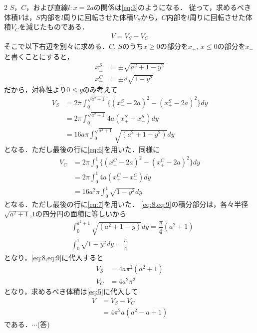 \documentclass[../../main.tex]{subfiles}
\begin{document}
\begin{multicols}{2}
  $S$，$C$，および直線$l:x=2a$の関係は\cref{eq:3}のようになる．
  従って，求めるべき体積$V$は，$S$内部を$l$周りに回転させた体積$V_S$から，$C$内部を$l$周りに回転させた体積$V_C$を減じたものである．
  \begin{align}
    V = V_S - V_C\label{eq:5}
  \end{align}
  そこで以下右辺を別々に求める．$C$, $S$のうち$x\ge 0$の部分を$x_{+}$, $x\le 0$の部分を$x_{-}$と書くことにすると，
  \begin{align}
    x^{S}_{\pm} & = \pm \sqrt{a^2+1-y^2} \label{eq:6} \\
    x^{C}_{\pm} & = \pm a\sqrt{1-y^2} \label{eq:7}
  \end{align}
  だから，対称性より$0\le y$のみ考えて
  \begin{align}
    V_S
    & = 2\pi \int_{0}^{\sqrt{a^2+1}} \{(x^{S}_{-} - 2a)^2 - (x^{S}_{+} - 2a)^2\} dy \nonumber \\
    & = 2\pi \int_{0}^{\sqrt{a^2+1}} 4a(x^{S}_{+} - x^{S}_{-}) dy \nonumber                   \\
    & = 16a\pi \int_{0}^{\sqrt{a^2+1}} \sqrt{(a^2+1-y^2)} dy \label{eq:8}
  \end{align}
  となる．ただし最後の行に\cref{eq:6}を用いた．同様に
  \begin{align}
    V_C
    & = 2\pi \int_{0}^{1} \{(x^{C}_{-} - 2a)^2 - (x^{C}_{+} - 2a)^2\} dy \nonumber \\
    & = 2\pi \int_{0}^{1} 4a(x^{C}_{+} - x^{C}_{-}) dy \nonumber                   \\
    & = 16a^2\pi \int_{0}^{1} \sqrt{1-y^2} dy \label{eq:9}
  \end{align}
  となる．ただし最後の行に\cref{eq:7}を用いた．
  \cref{eq:8,eq:9}の積分部分は，各々半径$\sqrt{a^2+1}$,$1$の四分円の面積に等しいから
  \begin{align}
    & \int_{0}^{a^2+1} \sqrt{(a^2+1-y)} dy = \dfrac{\pi}{4}(a^2+1) \\
    & \int_{0}^{1} \sqrt{1-y^2} dy = \dfrac{\pi}{4}
  \end{align}
  となり，\cref{eq:8,eq:9}に代入すると
  \begin{align}
    V_S & = 4a\pi^2 (a^2+1) \\
    V_C & = 4a^2\pi^2
  \end{align}
  となり，求めるべき体積は\cref{eq:5}に代入して
  \begin{align}
    V
    & = V_S - V_C         \\
    & = 4\pi^2a (a^2-a+1)
  \end{align}
  である．$\cdots$(答)


\end{multicols}
\end{document}
